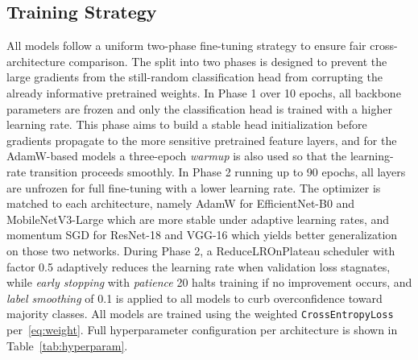 \documentclass[conference]{IEEEtran}
\begin{document}
\subsection{Training Strategy}

All models follow a uniform two-phase fine-tuning strategy to ensure
fair cross-architecture comparison.
The split into two phases is designed to prevent the large gradients
from the still-random classification head from corrupting the already
informative pretrained weights.
In Phase 1 over 10 epochs, all backbone parameters are frozen and
only the classification head is trained with a higher learning rate.
This phase aims to build a stable head initialization before gradients
propagate to the more sensitive pretrained feature layers, and for the
AdamW-based models a three-epoch \textit{warmup} is also used so that
the learning-rate transition proceeds smoothly.
In Phase 2 running up to 90 epochs, all layers are unfrozen for
full fine-tuning with a lower learning rate.
The optimizer is matched to each architecture, namely AdamW for
EfficientNet-B0 and MobileNetV3-Large which are more stable under
adaptive learning rates, and momentum SGD for ResNet-18 and VGG-16
which yields better generalization on those two networks.
During Phase 2, a ReduceLROnPlateau scheduler with factor 0.5
adaptively reduces the learning rate when validation loss stagnates,
while \textit{early stopping} with \textit{patience} 20 halts training
if no improvement occurs, and \textit{label smoothing} of 0.1 is
applied to all models to curb overconfidence toward majority classes.
All models are trained using the weighted \texttt{CrossEntropyLoss}
per~\eqref{eq:weight}.
Full hyperparameter configuration per architecture is shown in
Table~\ref{tab:hyperparam}.
\end{document}
